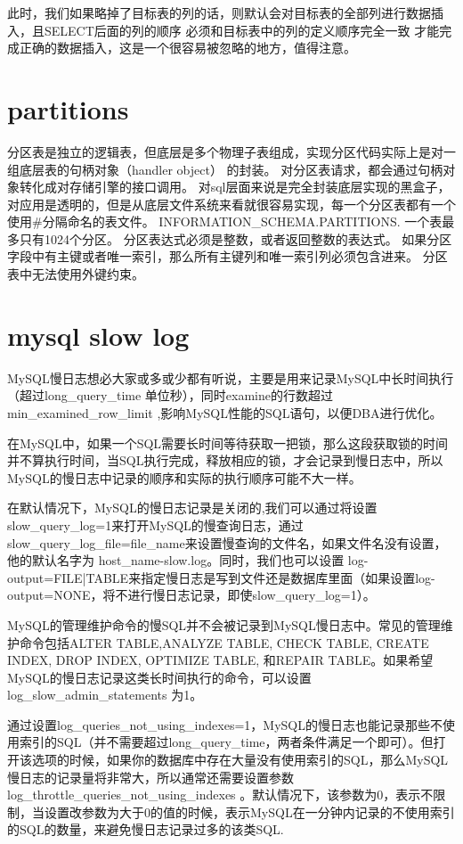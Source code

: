此时，我们如果略掉了目标表的列的话，则默认会对目标表的全部列进行数据插入，且SELECT后面的列的顺序 必须和目标表中的列的定义顺序完全一致 才能完成正确的数据插入，这是一个很容易被忽略的地方，值得注意。

\section{partitions}
分区表是独立的逻辑表，但底层是多个物理子表组成，实现分区代码实际上是对一组底层表的句柄对象（handler object） 的封装。
对分区表请求，都会通过句柄对象转化成对存储引擎的接口调用。
对sql层面来说是完全封装底层实现的黑盒子，对应用是透明的，但是从底层文件系统来看就很容易实现，每一个分区表都有一个使用\#分隔命名的表文件。
INFORMATION_SCHEMA.PARTITIONS. 一个表最多只有1024个分区。
分区表达式必须是整数，或者返回整数的表达式。
如果分区字段中有主键或者唯一索引，那么所有主键列和唯一索引列必须包含进来。
分区表中无法使用外键约束。

\section{mysql slow log}
MySQL慢日志想必大家或多或少都有听说，主要是用来记录MySQL中长时间执行（超过long_query_time 单位秒），同时examine的行数超过min_examined_row_limit ,影响MySQL性能的SQL语句，以便DBA进行优化。

在MySQL中，如果一个SQL需要长时间等待获取一把锁，那么这段获取锁的时间并不算执行时间，当SQL执行完成，释放相应的锁，才会记录到慢日志中，所以MySQL的慢日志中记录的顺序和实际的执行顺序可能不大一样。

在默认情况下，MySQL的慢日志记录是关闭的,我们可以通过将设置slow_query_log=1来打开MySQL的慢查询日志，通过slow_query_log_file=file_name来设置慢查询的文件名，如果文件名没有设置，他的默认名字为 host_name-slow.log。同时，我们也可以设置 log-output={FILE|TABLE}来指定慢日志是写到文件还是数据库里面（如果设置log-output=NONE，将不进行慢日志记录，即使slow_query_log=1）。

MySQL的管理维护命令的慢SQL并不会被记录到MySQL慢日志中。常见的管理维护命令包括ALTER TABLE,ANALYZE TABLE, CHECK TABLE, CREATE INDEX, DROP INDEX, OPTIMIZE TABLE, 和REPAIR TABLE。如果希望MySQL的慢日志记录这类长时间执行的命令，可以设置log_slow_admin_statements 为1。

通过设置log_queries_not_using_indexes=1，MySQL的慢日志也能记录那些不使用索引的SQL（并不需要超过long_query_time，两者条件满足一个即可）。但打开该选项的时候，如果你的数据库中存在大量没有使用索引的SQL，那么MySQL慢日志的记录量将非常大，所以通常还需要设置参数log_throttle_queries_not_using_indexes 。默认情况下，该参数为0，表示不限制，当设置改参数为大于0的值的时候，表示MySQL在一分钟内记录的不使用索引的SQL的数量，来避免慢日志记录过多的该类SQL.

